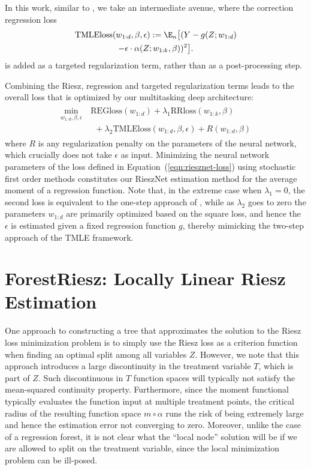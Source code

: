 \documentclass[nohyperref]{article}
\newcommand{\rrloss}{\ensuremath{\mathrm{RRloss}}}
\newcommand{\regloss}{\ensuremath{\mathrm{REGloss}}}
\newcommand{\tmleloss}{\ensuremath{\mathrm{TMLEloss}}}
\theoremstyle{plain}
\theoremstyle{definition}
\theoremstyle{remark}
\begin{document}
In this work, similar to \citet{shi2019adapting}, we take an intermediate avenue, where the correction regression loss
\begin{multline*}
  \tmleloss(w_{1:d}, \beta, \epsilon) := \E_n\big[ (Y - g(Z; w_{1:d}) \\ - \epsilon\cdot \alpha(Z; w_{1:k}, \beta))^2 \big].  
\end{multline*}
is added as a targeted regularization term, rather than as a post-processing step. 

Combining the Riesz, regression and targeted regularization terms leads to the overall loss that is optimized by our multitasking deep architecture:
\begin{align}
\begin{split}
    \min_{w_{1:d}, \beta, \epsilon} ~& \regloss(w_{1:d}) + \lambda_1 \rrloss(w_{1:k}, \beta) \\
    ~&~~ + \lambda_2 \tmleloss(w_{1:d}, \beta, \epsilon) + R(w_{1:d}, \beta) \label{eqn:riesznet-loss}
\end{split}
\end{align}
where $R$ is any regularization penalty on the parameters of the neural network, which crucially does not take $\epsilon$ as input. Minimizing the neural network parameters of the loss defined in Equation~(\ref{eqn:riesznet-loss}) using stochastic first order methods constitutes our RieszNet estimation method for the average moment of a regression function.
Note that, in the extreme case when $\lambda_1=0$, the second loss is equivalent to the one-step approach of \citet{bang2005doubly}, while as $\lambda_2$ goes to zero the parameters $w_{1:d}$ are primarily optimized based on the square loss, and hence the $\epsilon$ is estimated given a fixed regression function $g$, thereby mimicking the two-step approach of the TMLE framework. 



\section{ForestRiesz: Locally Linear Riesz Estimation}\label{sec:forestriesz}

One approach to constructing a tree that approximates the solution to the Riesz loss minimization problem is to simply use the Riesz loss as a criterion function when finding an optimal split among all variables $Z$. However, we note that this approach introduces a large discontinuity in the treatment variable $T$, which is part of $Z$. Such discontinuous in $T$ function spaces will typically not satisfy the mean-squared continuity property. Furthermore, since the moment functional typically evaluates the function input at multiple treatment points, the critical radius of the resulting function space $m\circ \alpha$ runs the risk of being extremely large and hence the estimation error not converging to zero. Moreover, unlike the case of a regression forest, it is not clear what the ``local node'' solution will be if we are allowed to split on the treatment variable, since the local minimization problem can be ill-posed.
\end{document}
